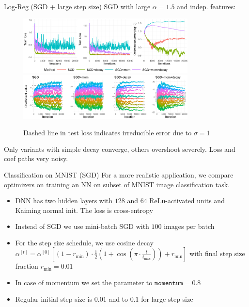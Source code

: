 \documentclass[11pt,compress,t,notes=noshow, xcolor=table]{beamer}
\begin{document}
\begin{vbframe}{Log-Reg (SGD + large step size)}
\vspace{-0.4cm}
SGD with large $\alpha=1.5$ and indep. features:
\begin{figure}
            \includegraphics[width=0.8\textwidth]{slides/04-multivariate-first-order/figure_man/simu_linmod/SGD_log_large_lr_iters.pdf} \\
             \includegraphics[width=0.8\textwidth]{slides/04-multivariate-first-order/figure_man/simu_linmod/SGD_log_coef_large.pdf}\\
            \begin{footnotesize}
                Dashed line in test loss indicates irreducible error due to $\sigma=1$
            \end{footnotesize}
\end{figure}
Only variants with simple decay converge, others overshoot severely. Loss and coef paths very noisy.
\end{vbframe}


\begin{vbframe}{Classification on MNIST (SGD)}
For a more realistic application, we compare optimizers on training an NN on subset of MNIST image classification task. 
\medskip
\begin{itemize}
     \setlength{\itemsep}{1.2em} 
    \item DNN has two hidden layers with $128$ and $64$ ReLu-activated units and Kaiming normal init. The loss is cross-entropy
    \item Instead of SGD we use mini-batch SGD with $100$ images per batch
    \item For the step size schedule, we use cosine decay $\alpha^{[t]} = \alpha^{[0]} \left[(1-r_{\text{min}}) \cdot \frac{1}{2}\left(1 + \cos\left(\pi \cdot \frac{t}{t_{\text{max}}}\right)\right) + r_{\text{min}}\right]$ with final step size fraction $r_{\text{min}}=0.01$
    \item In case of momentum we set the parameter to $\texttt{momentum}=0.8$
    \item Regular initial step size is $0.01$ and to $0.1$ for large step size
\end{itemize}
\end{vbframe}
\end{document}
